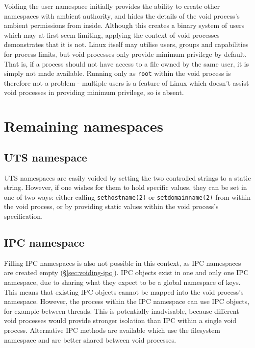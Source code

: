 \documentclass[12pt,a4paper,twoside]{report}
\begin{document}
Voiding the user namespace initially provides the ability to create other namespaces with ambient authority, and hides the details of the void process's ambient permissions from inside. Although this creates a binary system of users which may at first seem limiting, applying the context of void processes demonstrates that it is not. Linux itself may utilise users, groups and capabilities for process limits, but void processes only provide minimum privilege by default. That is, if a process should not have access to a file owned by the same user, it is simply not made available. Running only as \texttt{root} within the void process is therefore not a problem - multiple users is a feature of Linux which doesn't assist void processes in providing minimum privilege, so is absent.

\section{Remaining namespaces}

\subsection{UTS namespace}
\label{sec:filling-uts}

UTS namespaces are easily voided by setting the two controlled strings to a static string. However, if one wishes for them to hold specific values, they can be set in one of two ways: either calling \texttt{sethostname(2)} or \texttt{setdomainname(2)} from within the void process, or by providing static values within the void process's specification.

\subsection{IPC namespace}
\label{sec:filling-ipc}

Filling IPC namespaces is also not possible in this context, as IPC namespaces are created empty (§\ref{sec:voiding-ipc}). IPC objects exist in one and only one IPC namespace, due to sharing what they expect to be a global namespace of keys. This means that existing IPC objects cannot be mapped into the void process's namespace. However, the process within the IPC namespace can use IPC objects, for example between threads. This is potentially inadvisable, because different void processes would provide stronger isolation than IPC within a single void process. Alternative IPC methods are available which use the filesystem namespace and are better shared between void processes.
\end{document}
